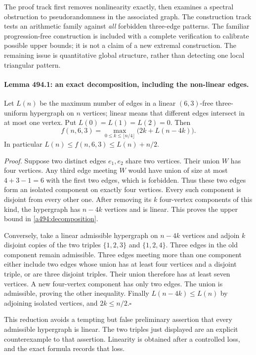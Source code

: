 \documentclass[11pt]{article}
\begin{document}
The proof track first removes nonlinearity exactly, then examines a spectral
obstruction to pseudorandomness in the associated graph. The construction
track tests an arithmetic family against \emph{all} forbidden three-edge
patterns. The familiar progression-free construction is included with a
complete verification to calibrate possible upper bounds; it is not a claim
of a new extremal construction. The remaining issue is quantitative global
structure, rather than detecting one local triangular pattern.

\paragraph{Lemma 494.1: an exact decomposition, including the non-linear edges.}
Let $L(n)$ be the maximum number of edges in a linear $(6,3)$-free
three-uniform hypergraph on $n$ vertices; linear means that different edges
intersect in at most one vertex. Put $L(0)=L(1)=L(2)=0$. Then
\begin{equation}\label{a494:decomposition}
 f(n,6,3)=\max_{0\leq k\leq\lfloor n/4\rfloor}
                  \bigl(2k+L(n-4k)\bigr).
\end{equation}
In particular $L(n)\leq f(n,6,3)\leq L(n)+n/2$.

\emph{Proof.} Suppose two distinct edges $e_1,e_2$ share two vertices.
Their union $W$ has four vertices. Any third edge meeting $W$ would have
union of size at most $4+3-1=6$ with the first two edges, which is forbidden.
Thus these two edges form an isolated component on exactly four vertices.
Every such component is disjoint from every other one. After removing its
$k$ four-vertex components of this kind, the hypergraph has $n-4k$ vertices
and is linear. This proves the upper bound in \eqref{a494:decomposition}.

Conversely, take a linear admissible hypergraph on $n-4k$ vertices and
adjoin $k$ disjoint copies of the two triples $\{1,2,3\}$ and
$\{1,2,4\}$. Three edges in the old component remain admissible. Three
edges meeting more than one component either include two edges whose union
has at least four vertices and a disjoint triple, or are three disjoint
triples. Their union therefore has at least seven vertices. A new
four-vertex component has only two edges. The union is admissible, proving
the other inequality. Finally $L(n-4k)\leq L(n)$ by adjoining isolated
vertices, and $2k\leq n/2$.\hfill$\square$

This reduction avoids a tempting but false preliminary assertion that every
admissible hypergraph is linear. The two triples just displayed are an
explicit counterexample to that assertion. Linearity is obtained after a
controlled loss, and the exact formula records that loss.
\end{document}
